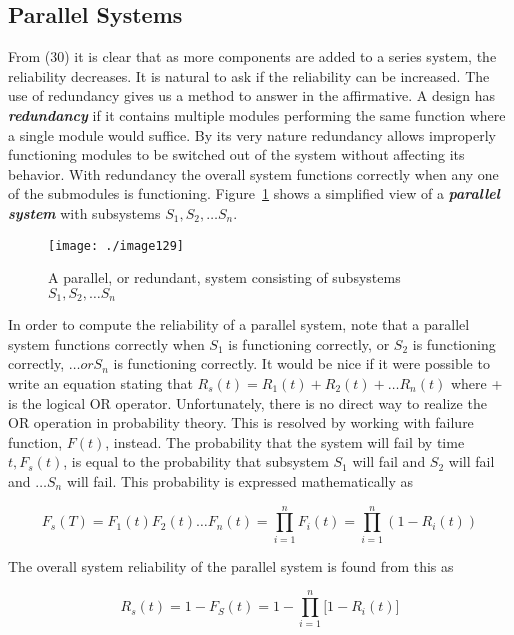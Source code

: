 \subsection{Parallel Systems}
\label{subsection:parallel-systems}

From (30) it is clear that as more components are added to a series
system, the reliability decreases. It is natural to ask if the
reliability can be increased. The use of redundancy gives us a method to
answer in the affirmative. A design has \emph{\textbf{redundancy}} if it
contains multiple modules performing the same function where a single
module would suffice. By its very nature redundancy allows improperly
functioning modules to be switched out of the system without affecting
its behavior. With redundancy the overall system functions correctly
when any one of the submodules is functioning. 
Figure~\ref{figure:parallelSystem} shows a
simplified view of a \emph{\textbf{parallel system}} with subsystems
$S_1, S_2, \ldots S_n$.

\begin{figure}
\texttt{[image: ./image129]}
\caption{A parallel, or redundant, system consisting of
subsystems $S_1, S_2, \ldots S_n$}
\label{figure:parallelSystem}
\end{figure}

In order to compute the reliability of a parallel system, note that a
parallel system functions correctly when $S_1$ is functioning correctly, or
$S_2$ is functioning correctly, $\ldots or S_n$ is functioning
correctly. It would be nice if it were possible to write an equation
stating that 
$R_s(t) = R_1(t) + R_2(t) + \ldots R_n(t)$ where + is
the logical OR operator. Unfortunately, there is no direct way to
realize the OR operation in probability theory. This is resolved by
working with failure function, $F(t)$, instead. The probability
that the system will fail by time $t, F_s(t)$, is equal to the probability
that subsystem $S_1$ will fail and $S_2$ will fail and $\ldots S_n$
will fail. This probability is expressed mathematically as


\begin{equation}
\label{equ:parallelFailureRate}
F_s(T) = F_1(t)F_2(t) \ldots F_n(t) = \prod_{i=1}^nF_i(t) = \prod_{i=1}^n(1-R_i(t))
\end{equation}


The overall system reliability of the parallel system is found from this
as

\begin{equation}
\label{equ:parallelReliability}
R_s(t) = 1-F_S(t) = 1 - \prod_{i=1}^n \big[ 1-R_i(t) \big]
\end{equation}

